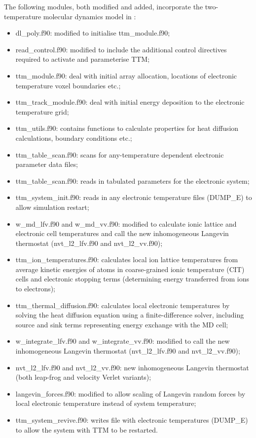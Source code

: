 The following modules, both modified and added, incorporate the 
two-temperature molecular dynamics model in \D:
\begin{itemize}
	\item  {\sc dl\_poly.f90}: modified to initialise {\sc ttm\_module.f90};
	\item  {\sc read\_control.f90}: modified to include the additional control directives required to activate and parameterise TTM;
	\item  {\sc ttm\_module.f90}: deal with initial array allocation, locations of electronic temperature voxel boundaries etc.;
	\item  {\sc ttm\_track\_module.f90}: deal with initial energy deposition to the electronic temperature grid;
	\item  {\sc ttm\_utils.f90}: contains functions to calculate properties for heat diffusion calculations, boundary conditions etc.;
	\item  {\sc ttm\_table\_scan.f90}: scans for any-temperature dependent electronic parameter data files;
	\item  {\sc ttm\_table\_scan.f90}: reads in tabulated parameters for the electronic system;
	\item  {\sc ttm\_system\_init.f90}: reads in any electronic temperature files (DUMP\_E) to allow simulation restart;
	\item  {\sc w\_md\_lfv.f90} and {\sc w\_md\_vv.f90}: modified to calculate ionic lattice and electronic cell temperatures and call the new inhomogeneous Langevin thermostat ({\sc nvt\_l2\_lfv.f90} and {\sc nvt\_l2\_vv.f90});
	\item  {\sc ttm\_ion\_temperatures.f90}: calculates local ion lattice temperatures from average kinetic energies of atoms in coarse-grained ionic temperature (CIT) cells and electronic stopping terms (determining energy transferred from ions to electrons);
	\item  {\sc ttm\_thermal\_diffusion.f90}: calculates local electronic temperatures by solving the heat diffusion equation using a finite-difference solver, including source and sink terms representing energy exchange with the MD cell;
	\item  {\sc w\_integrate\_lfv.f90} and {\sc w\_integrate\_vv.f90}: modified to call the new inhomogeneous Langevin thermostat ({\sc nvt\_l2\_lfv.f90} and {\sc nvt\_l2\_vv.f90});
	\item  {\sc nvt\_l2\_lfv.f90} and {\sc nvt\_l2\_vv.f90}: new inhomogeneous Langevin thermostat (both leap-frog and velocity Verlet variants);
	\item {\sc langevin\_forces.f90}: modified to allow scaling of Langevin random forces by local electronic temperature instead of system temperature;
    \item  {\sc ttm\_system\_revive.f90}: writes file with electronic temperatures (DUMP\_E) to allow the system with TTM to be restarted. 
\end{itemize}
